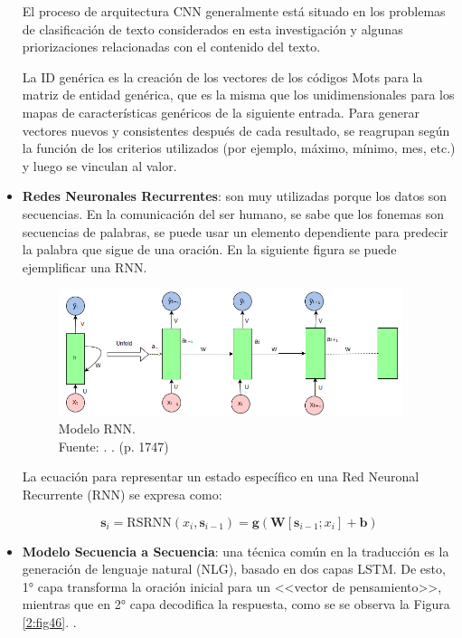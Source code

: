 \begin{itemize}
 	El proceso de arquitectura CNN generalmente está situado en los problemas de clasificación de texto considerados en esta investigación y algunas priorizaciones relacionadas con el contenido del texto.

 	La ID genérica es la creación de los vectores de los códigos Mots para la matriz de entidad genérica, que es la misma que los unidimensionales para los mapas de características genéricos de la siguiente entrada. Para generar vectores nuevos y consistentes después de cada resultado, se reagrupan según la función de los criterios utilizados (por ejemplo, máximo, mínimo, mes, etc.) y luego se vinculan al valor.

	\item \textbf{Redes Neuronales Recurrentes}: son muy utilizadas porque los datos son secuencias. En la comunicación del ser humano, se sabe que los fonemas son secuencias de palabras, se puede usar un elemento dependiente para predecir la palabra que sigue de una oración. En la siguiente figura se puede ejemplificar una RNN. \parencite{bk_rao2019nlp_pytorch}
	\begin{figure}[!ht]
		\begin{center}
			\includegraphics[width=0.95\textwidth]{2/figures/rnn.png}
			\caption[Modelo RNN]{Modelo RNN.\\
			Fuente: \cite{bk_rao2019nlp_pytorch}. . (p. 1747)}
			\label{2:fig41}
		\end{center}
	\end{figure}

	La ecuación para representar un estado específico en una Red Neuronal Recurrente (RNN) se expresa como:

	\begin{equation}\label{eq:RNN}
		\mathbf{s}_i = \text{RSRNN}(x_i, \mathbf{s}_{i-1}) = \mathbf{g}\left(\mathbf{W}[\mathbf{s}_{i-1}; x_i] + \mathbf{b}\right)
	\end{equation}

	\item \textbf{Modelo Secuencia a Secuencia}: una técnica común en la traducción es la generación de lenguaje natural (NLG), basado en dos capas LSTM. De esto, 1° capa transforma la oración inicial para un <<vector de pensamiento>>, mientras que en 2° capa decodifica la respuesta, como se se observa la Figura \ref{2:fig46}. \parencite{bk_deng2018deeplearningnlp}.
	

\end{itemize}
